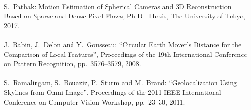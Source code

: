 \begin{mythebibliography}{}


\leavevmode \\S.~Pathak:
\newblock Motion Estimation of Spherical Cameras and 3D Reconstruction Based on Sparse and Dense Pixel Flows,
\newblock Ph.D.~Thesis, The University of Tokyo, 2017.
\\



\leavevmode \\J.~Rabin, J.~Delon and Y.~Gousseau:
\newblock ``Circular Earth Mover's Distance for the Comparison of Local Features'',
\newblock Proceedings of the 19th International Conference on Pattern Recognition, pp.~3576--3579, 2008.
\\

\leavevmode \\S.~Ramalingam, S.~Bouaziz, P.~Sturm and M.~Brand:
\newblock ``Geolocalization Using Skylines from Omni-Image'',
\newblock Proceedings of the 2011 IEEE International Conference on Computer Vision Workshop, pp.~23--30, 2011.
\\


\end{mythebibliography}
